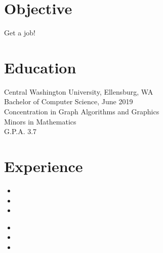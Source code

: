 \documentclass[10pt, a4paper]{article}
\begin{document}

\section*{Objective}
\vspace{-0.1in}
Get a job!
\vspace{-10pt}

\section*{Education}
\vspace{-0.1in}
Central Washington University, Ellensburg, WA \\
Bachelor of Computer Science, June 2019 \\
Concentration in Graph Algorithms and Graphics \\
Minors in Mathematics \\
G.P.A. 3.7
\vspace{-10pt}

\section*{Experience}

\noindent
{
  \hfill
  \hfill
}
\vspace{-0.1in}
\begin{itemize}
  \item \lipsum[1][1]
        \vspace{-0.1in}
  \item \lipsum[1][2]
        \vspace{-0.1in}
  \item \lipsum[1][3]
        \vspace{-0.05in}
\end{itemize}

\noindent
{
  \hfill
  \hfill
}
\vspace{-0.1in}
\begin{itemize}
  \item \lipsum[1][1]
        \vspace{-0.1in}
  \item \lipsum[1][2]
        \vspace{-0.1in}
  \item \lipsum[1][3]
        \vspace{-0.05in}
\end{itemize}
\end{document}
